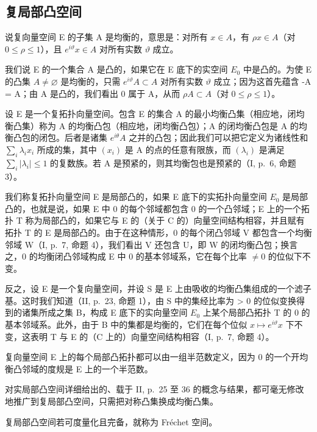 \subsection{复局部凸空间}

说复向量空间 E 的子集 A 是均衡的，意思是：对所有 \(x \in A\)，有 \(\rho x \in A\)（对 \(0 \leqslant \rho \leqslant 1\)），且 \(e^{i\vartheta}x \in A\) 对所有实数 \(\vartheta\) 成立。

我们说 E 的一个集合 A 是凸的，如果它在 E 底下的实空间 \(E_{0}\) 中是凸的。为使 E 的凸集 \(A \neq \varnothing\) 是均衡的，只需 \(e^{i\vartheta}A \subset A\) 对所有实数 \(\vartheta\) 成立；因为这首先蕴含 -A = A；由 A 是凸的，我们看出 0 属于 A，从而 \(\rho A \subset A\)（对 \(0 \leqslant \rho \leqslant 1\)）。

设 E 是一个复拓扑向量空间。包含 E 的集合 A 的最小均衡凸集（相应地，闭均衡凸集）称为 A 的均衡凸包（相应地，闭均衡凸包）；A 的闭均衡凸包是 A 的均衡凸包的闭包。后者是诸集 \(e^{i\theta}A\) 之并的凸包；因此我们可以把它定义为诸线性和 \(\sum_{i}\lambda_{i}x_{i}\) 所成的集，其中 \((x_{i})\) 是 A 的点的任意有限族，而 \((\lambda_{i})\) 是满足 \(\sum_{i}|\lambda_{i}| \leqslant 1\) 的复数族。若 A 是预紧的，则其均衡包也是预紧的（I, p.~6, 命题 3）。

我们称复拓扑向量空间 E 是局部凸的，如果 E 底下的实拓扑向量空间 \(E_{0}\) 是局部凸的，也就是说，如果 E 中 0 的每个邻域都包含 0 的一个凸邻域；E 上的一个拓扑 T 称为局部凸的，如果它与 E 的（关于 C 的）向量空间结构相容，并且赋有拓扑 T 的 E 是局部凸的。由于在这种情形，0 的每个闭凸邻域 V 都包含一个均衡邻域 W（I, p.~7, 命题 4），我们看出 V 还包含 U，即 W 的闭均衡凸包；换言之，0 的均衡闭凸邻域构成 E 中 0 的基本邻域系，它在每个比率 \(\neq 0\) 的位似下不变。

反之，设 E 是一个复向量空间，并设 S 是 E 上由吸收的均衡凸集组成的一个滤子基。这时我们知道（II, p.~23, 命题 1），由 S 中的集经比率为 \textgreater{} 0 的位似变换得到的诸集所成之集 B，构成 E 底下的实向量空间 \(E_{0}\) 上某个局部凸拓扑 T 的 0 的基本邻域系。此外，由于 B 中的集都是均衡的，它们在每个位似 \(x \mapsto e^{i\vartheta}x\) 下不变，这表明 T 与 E 的（C 上的）向量空间结构相容（I, p.~7, 命题 4）。

复向量空间 E 上的每个局部凸拓扑都可以由一组半范数定义，因为 0 的一个开均衡凸邻域的度规是 E 上的一个半范数。

对实局部凸空间详细给出的、载于 II, p.~25 至 36 的概念与结果，都可毫无修改地推广到复局部凸空间，只需把对称凸集换成均衡凸集。

复局部凸空间若可度量化且完备，就称为 Fréchet 空间。

